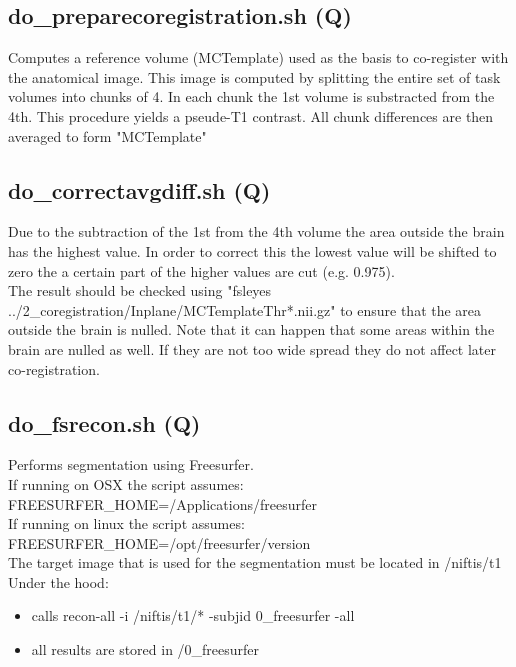 \documentclass[12pt,a4paper]{scrartcl}
\begin{document}
\subsection{do\_preparecoregistration.sh (Q)}
\label{sec:prepcoreg}
Computes a reference volume (MCTemplate) used as the basis  to co-register with the anatomical image. This image is computed by splitting the entire set of task volumes into chunks of 4. In each chunk the 1st volume is substracted from the 4th. This procedure yields a pseude-T1 contrast. All chunk differences are then averaged to form "MCTemplate"

\subsection{do\_correctavgdiff.sh (Q)}
\label{sec:corravg}
Due to the subtraction of the 1st from the 4th volume the area outside the brain has the highest value. In order to correct this the lowest value will be shifted to zero the a certain part of the higher values are cut (e.g. 0.975).\\

\noindent The result should be checked using "fsleyes ../2\_coregistration/Inplane/MCTemplateThr*.nii.gz" to ensure that the area outside the brain is nulled. Note that it can happen that some areas within the brain are nulled as well. If they are not too wide spread they do not affect later co-registration.

\subsection{do\_fsrecon.sh (Q)}
\label{sec:fsrecon}
Performs segmentation using Freesurfer.\\

\noindent If running on OSX the script assumes:\\
\noindent FREESURFER\_HOME=/Applications/freesurfer\\

\noindent If running on linux the script assumes:\\
\noindent FREESURFER\_HOME=/opt/freesurfer/version\\

\noindent The target image that is used for the segmentation must be located in /niftis/t1\\

\noindent Under the hood:
\begin{itemize}
\item calls recon-all -i /niftis/t1/* -subjid  0\_freesurfer -all
\item all results are stored in /0\_freesurfer
\end{itemize}
\end{document}
